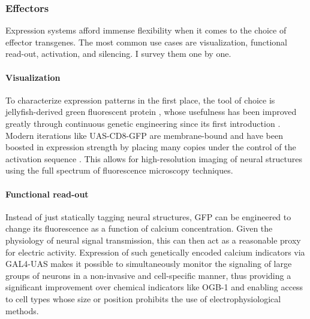 \subsubsection{Effectors}

Expression systems afford immense flexibility when it comes to the choice of effector transgenes. The most common use cases are visualization, functional read-out, activation, and silencing. I survey them one by one.

\paragraph{Visualization} To characterize expression patterns in the first place, the tool of choice is jellyfish-derived green fluorescent protein \citep[GFP;][]{Chalfie:1994aa}, whose usefulness has been improved greatly through continuous genetic engineering since its first introduction \citep[see for instance][]{Heim:1995aa}. Modern iterations like UAS-CD8-GFP are membrane-bound and have been boosted in expression strength by placing many copies under the control of the activation sequence \citep{Pfeiffer:2010aa}. This allows for high-resolution imaging of neural structures using the full spectrum of fluorescence microscopy techniques.

\paragraph{Functional read-out} Instead of just statically tagging neural structures, GFP can be engineered to change its fluorescence as a function of calcium concentration. Given the physiology of neural signal transmission, this can then act as a reasonable proxy for electric activity. Expression of such genetically encoded calcium indicators via GAL4-UAS makes it possible to simultaneously monitor the signaling of large groups of neurons in a non-invasive and cell-specific manner, thus providing a significant improvement over chemical indicators like OGB-1 \citep{Hendel:2008fp} and enabling access to cell types whose size or position prohibits the use of electrophysiological methods.

